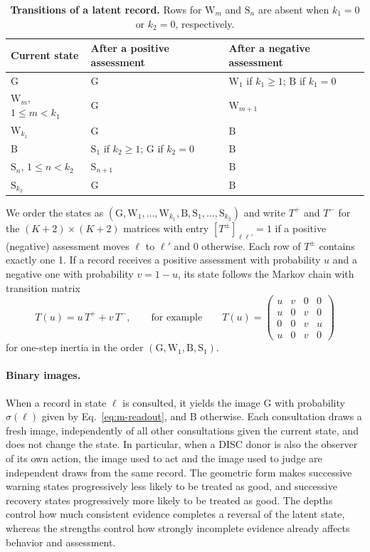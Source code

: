\documentclass[fleqn,10pt]{wlscirep}
\newcommand{\st}[1]{\mathrm{#1}}           %
\theoremstyle{plain}
\begin{document}
\begin{table}[!htbp]
\centering
\caption{\textbf{Transitions of a latent record.} Rows for $\st W_m$ and $\st S_n$ are absent when $k_1=0$ or $k_2=0$, respectively.}
\label{tab:si-transitions}
\small
\begin{tabular}{@{}lll@{}}
\toprule
Current state & After a positive assessment & After a negative assessment\\
\midrule
$\st G$ & $\st G$ & $\st W_1$ if $k_1\geq1$; $\st B$ if $k_1=0$\\
$\st W_m$, $1\leq m<k_1$ & $\st G$ & $\st W_{m+1}$\\
$\st W_{k_1}$ & $\st G$ & $\st B$\\
$\st B$ & $\st S_1$ if $k_2\geq1$; $\st G$ if $k_2=0$ & $\st B$\\
$\st S_n$, $1\leq n<k_2$ & $\st S_{n+1}$ & $\st B$\\
$\st S_{k_2}$ & $\st G$ & $\st B$\\
\bottomrule
\end{tabular}
\end{table}

We order the states as $(\st G,\st W_1,\ldots,\st W_{k_1},\st B,\st S_1,\ldots,\st S_{k_2})$ and write $T^+$ and $T^-$ for the $(K+2)\times(K+2)$ matrices with entry $[T^\pm]_{\ell\ell'}=1$ if a positive (negative) assessment moves $\ell$ to $\ell'$ and 0 otherwise. Each row of $T^\pm$ contains exactly one 1. If a record receives a positive assessment with probability $u$ and a negative one with probability $v=1-u$, its state follows the Markov chain with transition matrix
\begin{equation}
T(u)=u\,T^++v\,T^-,\qquad\text{for example}\qquad
T(u)=\begin{pmatrix}u&v&0&0\\u&0&v&0\\0&0&v&u\\u&0&v&0\end{pmatrix}
\label{eq:s-transition}
\end{equation}
for one-step inertia in the order $(\st G,\st W_1,\st B,\st S_1)$.

\paragraph{Binary images.} When a record in state $\ell$ is consulted, it yields the image G with probability $\sigma(\ell)$ given by Eq.~\eqref{eq:m-readout}, and B otherwise. Each consultation draws a fresh image, independently of all other consultations given the current state, and does not change the state. In particular, when a DISC donor is also the observer of its own action, the image used to act and the image used to judge are independent draws from the same record. The geometric form makes successive warning states progressively less likely to be treated as good, and successive recovery states progressively more likely to be treated as good. The depths control how much consistent evidence completes a reversal of the latent state, whereas the strengths control how strongly incomplete evidence already affects behavior and assessment.
\end{document}
